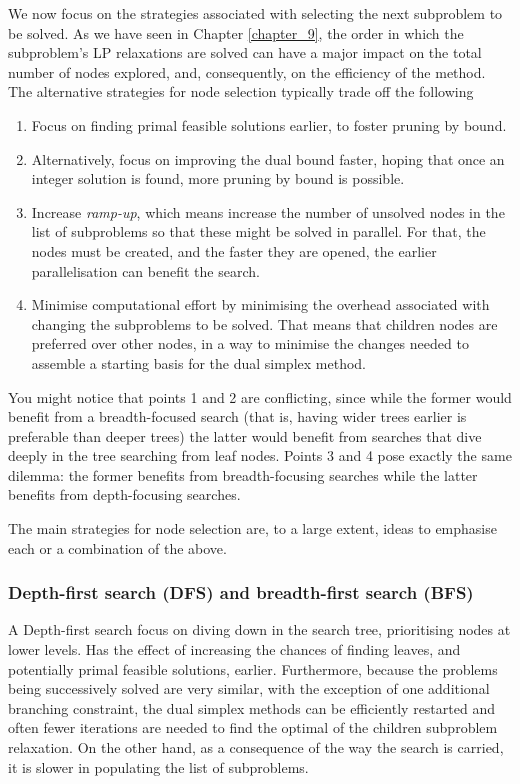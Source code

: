 We now focus on the strategies associated with selecting the next subproblem to be solved. As we have seen in Chapter \ref{chapter_9}, the order in which the subproblem's LP relaxations are solved can have a major impact on the total number of nodes explored, and, consequently, on the efficiency of the method. The alternative strategies for node selection typically trade off the following
%
\begin{enumerate}
	\item Focus on finding primal feasible solutions earlier, to foster pruning by bound.
	\item Alternatively, focus on improving the dual bound faster, hoping that once an integer solution is found, more pruning by bound is possible.
	\item Increase \emph{ramp-up}, which means increase the number of unsolved nodes in the list of subproblems so that these might be solved in parallel. For that, the nodes must be created, and the faster they are opened, the earlier parallelisation	can benefit the search.
	\item Minimise computational effort by minimising the overhead associated with changing the subproblems to be solved. That means that children nodes are preferred over other nodes, in a way to minimise the changes needed to assemble a starting basis for the dual simplex method.
\end{enumerate}

You might notice that points 1 and 2 are conflicting, since while the former would benefit from a breadth-focused search (that is, having wider trees earlier is preferable than deeper trees) the latter would benefit from searches that dive deeply in the tree searching from leaf nodes. Points 3 and 4 pose exactly the same dilemma: the former benefits from breadth-focusing searches while the latter benefits from depth-focusing searches.

The main strategies for node selection are, to a large extent, ideas to emphasise each or a combination of the above. 

\subsubsection{Depth-first search (DFS) and breadth-first search (BFS)}

A Depth-first search focus on diving down in the search tree, prioritising nodes at lower levels. Has the effect of increasing the chances of finding leaves, and potentially primal feasible solutions, earlier. Furthermore, because the problems being successively solved are very similar, with the exception of one additional branching constraint, the dual simplex methods can be efficiently restarted and often fewer iterations are needed to find the optimal of the children subproblem relaxation. On the other hand, as a consequence of the way the search is carried, it is slower in populating the list of subproblems. 

